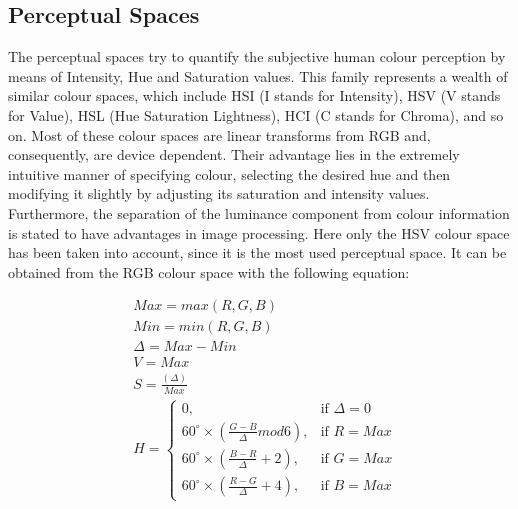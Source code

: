 \documentclass[final,a4paper,12pt,english]{UnicaPhdThesis3}
\begin{document}
	\subsection{Perceptual Spaces}  %
	The perceptual spaces try to quantify the subjective human colour perception by means of Intensity, Hue and Saturation values. This family represents a wealth of similar colour spaces, which include HSI (I stands for Intensity), HSV (V stands for Value), HSL (Hue Saturation Lightness), HCI (C stands for Chroma), and so on. Most of these colour spaces are linear transforms from RGB and, consequently, are device dependent. Their advantage lies in the extremely intuitive manner of specifying colour, selecting the desired hue and then modifying it slightly by adjusting its saturation and intensity values. Furthermore, the separation of the luminance component from colour information is stated to have advantages in image processing. Here only the HSV colour space has been taken into account, since it is the most used perceptual space. It can be obtained from the RGB colour space with the following equation:
	
	\begin{equation}\label{HSV}
	\begin{split}
	&Max = max(R, G, B)\\
	&Min = min(R, G, B)\\
	&\Delta = Max-Min\\
	&V = Max\\
	&S = \frac{(\Delta)}{Max}\\
	&H = \begin{cases} 0, & \mbox{if   } \Delta = 0 \\ 60^\circ \times \left (\frac{G-B}{\Delta} mod6 \right ), & \mbox{if   } R = Max \\  
	60^\circ \times \left ( \frac{B-R}{\Delta} + 2 \right ), & \mbox{if   } G = Max\\ 
	60^\circ \times \left ( \frac{R-G}{\Delta} + 4 \right ), & \mbox{if   } B = Max\end{cases} 
	\end{split}
	\end{equation}
	
\end{document}
